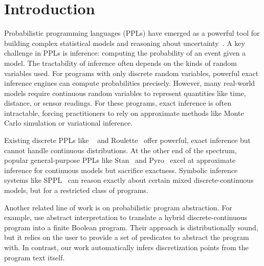 \section{Introduction}\label{sec:intro}
Probabilistic programming languages (PPLs) have emerged as a powerful tool for building complex statistical models and reasoning about uncertainty~\cite{Moy2025Roulette,Holtzen2020Dice,DeRaedt2007ProbLog,Saad2021SPPL,Carpenter2017Stan,Salvatier2016PyMC3,Bingham2019Pyro,Dillon2017TFP,Tran2016Edward,Tolpin2016Anglican,Goodman2014WebPPL,Pfeffer2009Figaro,Minka2018InferNET,Ge2018Turing,CusumanoTowner2019Gen,Tehrani2020BeanMachine,Goodman2008Church}. A key challenge in PPLs is inference: computing the probability of an event given a model. The tractability of inference often depends on the kinds of random variables used. For programs with only discrete random variables, powerful exact inference engines can compute probabilities precisely. However, many real-world models require continuous random variables to represent quantities like time, distance, or sensor readings. For these programs, exact inference is often intractable, forcing practitioners to rely on approximate methods like Monte Carlo simulation or variational inference. 

Existing discrete PPLs like \Dice~\cite{Holtzen2020Dice} and Roulette~\cite{Moy2025Roulette} offer powerful, exact inference but cannot handle continuous distributions. At the other end of the spectrum, popular general-purpose PPLs like Stan~\cite{Carpenter2017Stan} and Pyro~\cite{Bingham2019Pyro} excel at approximate inference for continuous models but sacrifice exactness. Symbolic inference systems like SPPL~\cite{Saad2021SPPL} can reason exactly about certain mixed discrete-continuous models, but for a restricted class of programs.

Another related line of work is on probabilistic program abstraction.
For example, \cite{Holtzen2018Abstraction} use abstract interpretation to translate a hybrid discrete-continuous program into a finite Boolean program.
Their approach is distributionally sound, but it relies on the user to provide a set of predicates to abstract the program with.
In contrast, our work automatically infers discretization points from the program text itself.

